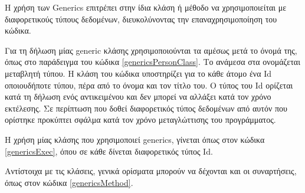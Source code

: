 Η χρήση των Generics επιτρέπει στην ίδια κλάση ή μέθοδο να χρησιμοποιείται με διαφορετικούς τύπους δεδομένων, διευκολύνοντας την επαναχρησιμοποίηση του κώδικα.

Για τη δήλωση μίας generic κλάσης χρησιμοποιούνται τα \codebox{<>} αμέσως μετά το όνομά της, όπως στο παράδειγμα του κώδικα \ref{genericsPersonClass}. Το  ανάμεσα στα \codebox{<>} ονομάζεται μεταβλητή τύπου. Η κλάση του κώδικα υποστηρίζει για το κάθε άτομο ένα Id οποιουδήποτε τύπου, πέρα από το όνομα και τον τίτλο του. Ο τύπος του Id ορίζεται κατά τη δήλωση ενός αντικειμένου και δεν μπορεί να αλλάξει κατά τον χρόνο εκτέλεσης. Σε περίπτωση που δοθεί διαφορετικός τύπος δεδομένων από αυτόν που ορίστηκε προκύπτει σφάλμα κατά τον χρόνο μεταγλώττισης του προγράμματος. 



Η χρήση μίας κλάσης που χρησιμοποιεί generics, γίνεται όπως στον κώδικα \ref{genericsExec}, όπου σε κάθε  δίνεται διαφορετικός τύπος Id.



Αντίστοιχα με τις κλάσεις, γενικά ορίσματα μπορούν να δέχονται και οι συναρτήσεις, όπως στον κώδικα \ref{genericsMethod}.




